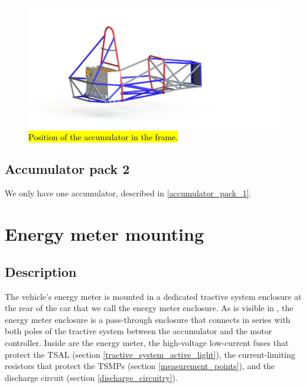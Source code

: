 \documentclass{article}
\begin{document}
\begin{figure}[H]
	\centering  %
	
	\includegraphics[width=1\textwidth]{acc_in_frame}
	
	\caption{\hl{Position of the accumulator in the frame.}}
	
	\label{fig:acc_in_frame}
\end{figure}

\subsection{Accumulator pack 2}\label{accumulator_pack_2}
We only have one accumulator, described in \ref{accumulator_pack_1}.

\section{Energy meter mounting} \label{energy_meter_mounting}
\subsection{Description}
The vehicle's energy meter is mounted in a dedicated tractive system enclosure at the rear of the car that we call the energy meter enclosure. As is visible in , the energy meter enclosure is a pass-through enclosure that connects in series with both poles of the tractive system between the accumulator and the motor controller. Inside are the energy meter, the high-voltage low-current fuses that protect the TSAL (section \ref{tractive_system_active_light}), the current-limiting resistors that protect the TSMPs (section \ref{measurement_points}), and the discharge circuit (section \ref{discharge_circuitry}). 
\end{document}

